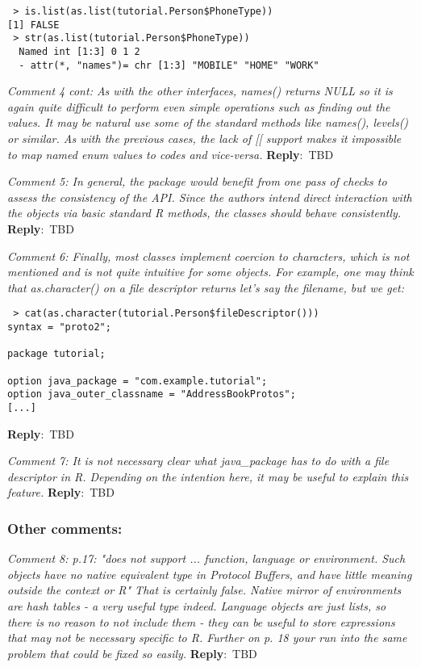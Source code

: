 \documentclass[10pt]{article}
\newcommand{\pointRaised}[2]{\smallskip %
  \textsl{{\fontseries{b}\selectfont #1}: #2}\newline}
\newcommand{\reply}[1]{\textbf{Reply}:\ #1 \smallskip } %
\begin{document}
\begin{verbatim}
 > is.list(as.list(tutorial.Person$PhoneType))
[1] FALSE
 > str(as.list(tutorial.Person$PhoneType))
  Named int [1:3] 0 1 2
  - attr(*, "names")= chr [1:3] "MOBILE" "HOME" "WORK"
\end{verbatim}

\pointRaised{Comment 4 cont}{As with the other interfaces, names() returns NULL so it is again quite
  difficult to perform even simple operations such as finding out the 
  values. It may be natural use some of the standard methods like names(), 
  levels() or similar. As with the previous cases, the lack of [[ support
  makes it impossible to map named enum values to codes and vice-versa.}
\reply{TBD}

\pointRaised{Comment 5}{In general, the package would benefit from one pass of checks to assess
  the consistency of the API. Since the authors intend direct interaction
  with the objects via basic standard R methods, the classes should behave 
  consistently.}
\reply{TBD}

\pointRaised{Comment 6}{Finally, most classes implement coercion to characters, which is not 
  mentioned and is not quite intuitive for some objects. For example, one
  may think that as.character() on a file descriptor returns let's say the 
  filename, but we get:}

\begin{verbatim}
 > cat(as.character(tutorial.Person$fileDescriptor()))
syntax = "proto2";

package tutorial;

option java_package = "com.example.tutorial";
option java_outer_classname = "AddressBookProtos";
[...]
\end{verbatim}
\reply{TBD}

\pointRaised{Comment 7}{It is not necessary clear what java\_package has to do with a file 
  descriptor in R. Depending on the intention here, it may be useful to 
  explain this feature.
}
\reply{TBD}

\subsubsection*{Other comments:}

\pointRaised{Comment 8}{p.17: "does not support ... function, language or environment. Such 
  objects have no native equivalent type in Protocol Buffers, and have 
  little meaning outside the context or R"
  That is certainly false. Native mirror of environments are hash tables - 
  a very useful type indeed. Language objects are just lists, so there is
  no reason to not include them - they can be useful to store expressions
  that may not be necessary specific to R. Further on p. 18 your run into
  the same problem that could be fixed so easily.}
\reply{TBD}
\end{document}
